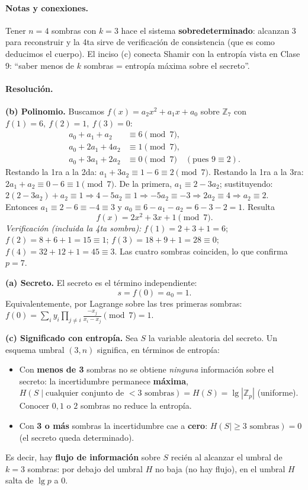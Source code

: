 \paragraph{Notas y conexiones.}
Tener $n=4$ sombras con $k=3$ hace el sistema \textbf{sobredeterminado}: alcanzan 3 para reconstruir y la 4ta sirve de verificación de consistencia (que es como deducimos el cuerpo). El inciso (c) conecta Shamir con la entropía vista en Clase 9: ``saber menos de $k$ sombras = entropía máxima sobre el secreto''.

\paragraph{Resolución.}
\textbf{(b) Polinomio.} Buscamos $f(x)=a_2x^2+a_1x+a_0$ sobre $\mathbb{Z}_7$ con $f(1)=6,\ f(2)=1,\ f(3)=0$:
\begin{align*}
  a_0+a_1+a_2 &\equiv 6 \pmod 7,\\
  a_0+2a_1+4a_2 &\equiv 1 \pmod 7,\\
  a_0+3a_1+2a_2 &\equiv 0 \pmod 7 \quad (\text{pues } 9\equiv 2).
\end{align*}
Restando la 1ra a la 2da: $a_1+3a_2\equiv 1-6\equiv 2 \pmod 7$. Restando la 1ra a la 3ra: $2a_1+a_2\equiv 0-6\equiv 1 \pmod 7$. De la primera, $a_1\equiv 2-3a_2$; sustituyendo: $2(2-3a_2)+a_2\equiv 1 \Rightarrow 4-5a_2\equiv 1 \Rightarrow -5a_2\equiv -3 \Rightarrow 2a_2\equiv 4 \Rightarrow a_2\equiv 2$. Entonces $a_1\equiv 2-6\equiv -4\equiv 3$ y $a_0\equiv 6-a_1-a_2 = 6-3-2 = 1$. Resulta
\begin{equation*}
  \boxed{f(x) = 2x^2 + 3x + 1 \pmod 7}.
\end{equation*}
\emph{Verificación (incluida la 4ta sombra):} $f(1)=2+3+1=6$; $f(2)=8+6+1=15\equiv 1$; $f(3)=18+9+1=28\equiv 0$; $f(4)=32+12+1=45\equiv 3$. Las cuatro sombras coinciden, lo que confirma $p=7$.

\textbf{(a) Secreto.} El secreto es el término independiente:
\begin{equation*}
  s = f(0) = a_0 = \boxed{1}.
\end{equation*}
Equivalentemente, por Lagrange sobre las tres primeras sombras: $f(0)=\sum_i y_i\prod_{j\neq i}\frac{-x_j}{x_i-x_j}\pmod 7 = 1$.

\textbf{(c) Significado con entropía.} Sea $S$ la variable aleatoria del secreto. Un esquema umbral $(3,n)$ significa, en términos de entropía:
\begin{itemize}
  \item Con \textbf{menos de 3} sombras no se obtiene \emph{ninguna} información sobre el secreto: la incertidumbre permanece \textbf{máxima}, $H(S\mid \text{cualquier conjunto de }<3\text{ sombras}) = H(S) = \lg|\mathbb{Z}_p|$ (uniforme). Conocer $0,1$ o $2$ sombras no reduce la entropía.
  \item Con \textbf{3 o más} sombras la incertidumbre cae a \textbf{cero}: $H(S\mid \ge 3\text{ sombras}) = 0$ (el secreto queda determinado).
\end{itemize}
Es decir, hay \textbf{flujo de información} sobre $S$ recién al alcanzar el umbral de $k=3$ sombras: por debajo del umbral $H$ no baja (no hay flujo), en el umbral $H$ salta de $\lg p$ a $0$.

